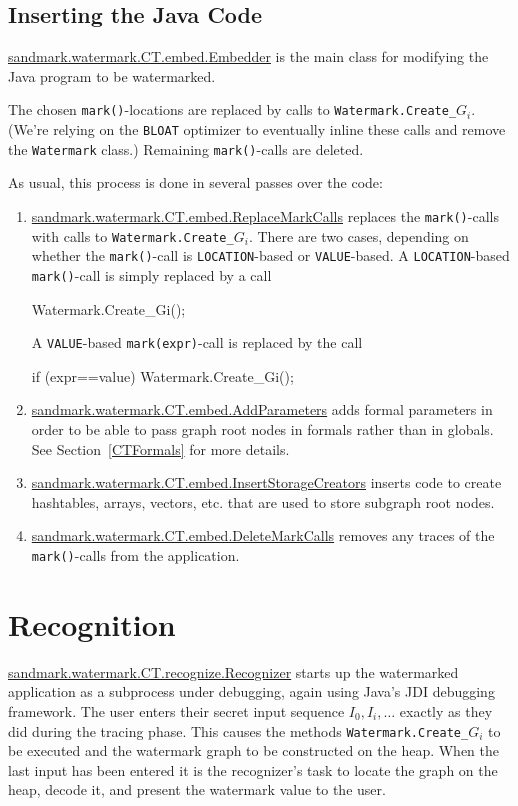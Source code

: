\subsection{Inserting the Java Code}
\url{sandmark.watermark.CT.embed.Embedder} is the main class for 
modifying the Java program to be watermarked.

The chosen {\tt mark()}-locations are replaced by calls to 
{\tt Watermark.Create\_$G_i$}. (We're relying on the {\tt BLOAT} 
optimizer to eventually inline these calls and remove the
{\tt Watermark} class.) Remaining {\tt mark()}-calls are deleted.

As usual, this process is done in several passes over the code:
\begin{enumerate}
   \item \url{sandmark.watermark.CT.embed.ReplaceMarkCalls} replaces the
         {\tt mark()}-calls with calls to {\tt Watermark.Create\_$G_i$}.
         There are two cases, depending on whether the
         {\tt mark()}-call is {\tt LOCATION}-based or {\tt VALUE}-based.
         A {\tt LOCATION}-based {\tt mark()}-call is simply replaced
         by a call
\begin{listing}{1}
   Watermark.Create_Gi();
\end{listing}
         A {\tt VALUE}-based {\tt mark(expr)}-call is replaced by the call
\begin{listing}{1}
   if (expr==value)
      Watermark.Create_Gi();
\end{listing}
   \item  \url{sandmark.watermark.CT.embed.AddParameters} adds formal parameters
         in order to be able to pass graph root nodes in formals
         rather than in globals. See Section~\ref{CTFormals} for
         more details.
   \item \url{sandmark.watermark.CT.embed.InsertStorageCreators} inserts code
         to create hashtables, arrays, vectors, etc. that are used
         to store subgraph root nodes.
   \item \url{sandmark.watermark.CT.embed.DeleteMarkCalls} removes any traces
         of the {\tt mark()}-calls from the application.
\end{enumerate}


\section{Recognition}
\url{sandmark.watermark.CT.recognize.Recognizer} starts up the watermarked
application as a subprocess under debugging, again 
using Java's JDI debugging framework. The user enters their
secret input sequence $I_0,I_i,\ldots$ exactly as they did
during the tracing phase. This causes the methods
{\tt Watermark.Create\_$G_i$} to be executed and the 
watermark graph to be constructed on the heap. When the
last input has been entered it is the recognizer's task
to locate the graph on the heap, decode it, and present
the watermark value to the user.

